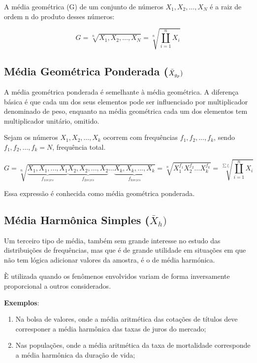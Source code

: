 A média geométrica (G) de um conjunto de números $X_{1},X_{2},\ldots,X_{N}$ é a raiz de ordem n do produto
desses números:

\begin{equation}\label{Geometrica}
    G=\sqrt[n]{X_{1},X_{2},\ldots,X_{N}}=\sqrt[n]{\coprod_{i=1}^{n}X_{i}}
\end{equation}


\subsection{Média Geométrica Ponderada ($\Bar{X}_{g_{p}})$}

A média geométrica ponderada é semelhante à média geométrica. A diferença básica é que cada um dos seus elementos pode ser influenciado por multiplicador denominado de peso, enquanto na média geométrica cada um dos elementos tem multiplicador unitário, omitido.\vskip0.3cm


Sejam os números $X_{1},X_{2},\ldots,X_{k}$ ocorrem com frequências $f_{1},f_{2},\ldots,f_{k}$, sendo $f_{1},f_{2},\ldots,f_{k}=N$, frequência total.


\begin{equation}\label{Geometrica}
    G=\sqrt[n]{\underbrace{X_{1},X_{1},...,X_{1}}_{f_{1vezes}}\underbrace{X_{2},X_{2},...,X_{2}}_{f_{2vezes}} \ldots \underbrace{X_{k},X_{k},...,X_{k}}_{f_{kvezes}}}=\sqrt[n]{X_{1}^{f_{1}}X_{2}^{f_{2}}\ldots X_{k}^{f_{k}}}
 = \sqrt[\sum f_{i}]{\coprod_{i=1}^{n}X_{i}}
\end{equation}

Essa expressão é conhecida como média geométrica ponderada.



\subsection{Média Harmônica Simples ($\bar{X}_{h})$}


\inic Um terceiro tipo de média, também sem grande interesse no estudo das
distribuições de frequências, mas que é de grande utilidade em situações em que não
tem lógica adicionar valores da amostra, é o de média harmónica.\vskip0.3cm



È utilizada quando os fenômenos envolvidos variam de forma inversamente proporcional a outros considerados.\vskip0.3cm

\textbf{Exemplos}:
\begin{enumerate}
  \item Na bolsa de valores, onde a média aritmética das cotações de títulos deve corresponer a média harmônica das taxas de juros do mercado;
  \item Nas populações, onde a média aritmética da taxa de mortalidade corresponde a média harmônica da duração de vida;
\end{enumerate}

